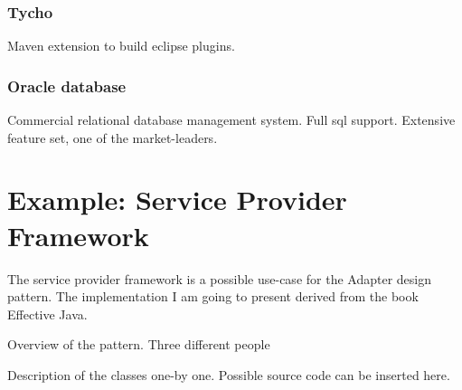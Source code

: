 \subsubsection{Tycho}
Maven extension to build eclipse plugins.
\subsubsection{Oracle database}
Commercial relational database management system. Full sql support. Extensive
feature set, one of the market-leaders.


\section{Example: Service Provider Framework}
\label{sect:example}

The service provider framework is a possible use-case for the Adapter design
pattern. The implementation I am going to present derived from the book
\cite{Bloch08} Effective Java.

Overview of the pattern. 
Three different people 

Description of the classes one-by one. Possible source code can be inserted
here.



